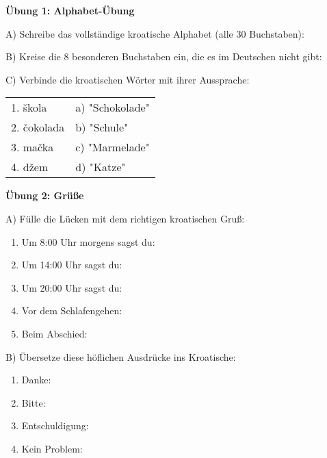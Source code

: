 \begin{exercise}
\textbf{Übung 1: Alphabet-Übung}

A) Schreibe das vollständige kroatische Alphabet (alle 30 Buchstaben):

\vspace{2cm}

B) Kreise die 8 besonderen Buchstaben ein, die es im Deutschen nicht gibt:

\vspace{1cm}

C) Verbinde die kroatischen Wörter mit ihrer Aussprache:

\begin{tabular}{ll}
1. škola & a) "Schokolade" \\
2. čokolada & b) "Schule" \\
3. mačka & c) "Marmelade" \\
4. džem & d) "Katze" \\
\end{tabular}

\vspace{2cm}

\textbf{Übung 2: Grüße}

A) Fülle die Lücken mit dem richtigen kroatischen Gruß:

\begin{enumerate}
    \item Um 8:00 Uhr morgens sagst du: \underline{\hspace{5cm}}
    \item Um 14:00 Uhr sagst du: \underline{\hspace{5cm}}
    \item Um 20:00 Uhr sagst du: \underline{\hspace{5cm}}
    \item Vor dem Schlafengehen: \underline{\hspace{5cm}}
    \item Beim Abschied: \underline{\hspace{5cm}}
\end{enumerate}

B) Übersetze diese höflichen Ausdrücke ins Kroatische:

\begin{enumerate}
    \item Danke: \underline{\hspace{5cm}}
    \item Bitte: \underline{\hspace{5cm}}
    \item Entschuldigung: \underline{\hspace{5cm}}
    \item Kein Problem: \underline{\hspace{5cm}}
\end{enumerate}


\end{exercise}
